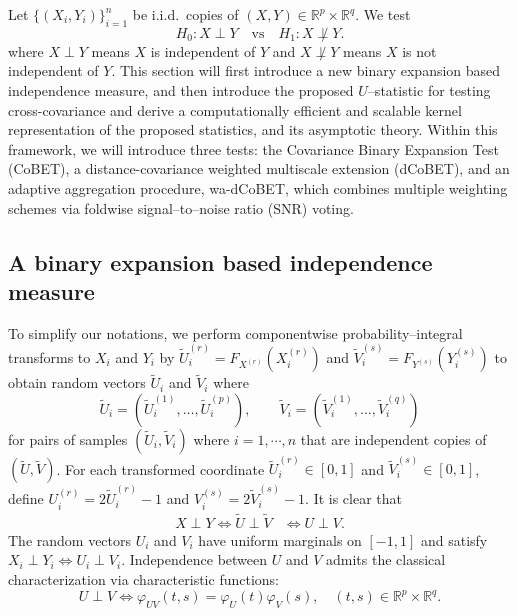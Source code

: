 \documentclass[12pt,reqno,oneside]{amsbook}
\theoremstyle{definition}
\theoremstyle{remark}
\begin{document}
Let $\{(X_i,Y_i)\}_{i=1}^n$ be i.i.d.\ copies of $(X,Y)\in\mathbb R^p\times\mathbb R^q$. 
We test
\[
H_0: X\perp Y
\quad \text{vs} \quad
H_1: X\not\perp Y .
\]
where $X\perp Y$ means $X$ is independent of $Y$ and $X \not\perp Y$ means $X$ is not independent of $Y$.
This section will first introduce a new binary expansion based independence measure, and then introduce the proposed $U$--statistic for testing cross-covariance and derive a computationally efficient and scalable kernel 
representation of the proposed statistics, and its asymptotic theory.
Within this framework, we will introduce three tests: the Covariance Binary Expansion Test (CoBET), a distance-covariance weighted multiscale extension (dCoBET), and an adaptive aggregation procedure, wa-dCoBET, which
combines multiple weighting schemes via foldwise signal--to--noise ratio (SNR) voting.


\subsection{A binary expansion based independence measure}
\label{binary_inde}
To simplify our notations, we perform componentwise probability--integral transforms
to $X_i$ and $Y_i$ by $\tilde{U}_i^{(r)} = F_{X^{(r)}}(X_i^{(r)})$ and $\tilde{V}_i^{(s)} = F_{Y^{(s)}}(Y_i^{(s)})$
to obtain random vectors $\tilde{U}_i$ and $\tilde{V}_i$ where 
\[
\tilde{U}_i = (\tilde{U}_i^{(1)},\dots,\tilde{U}_i^{(p)}),
\qquad
\tilde{V}_i = (\tilde{V}_i^{(1)},\dots,\tilde{V}_i^{(q)})
\]
for pairs of samples $(\tilde{U}_i,\tilde{V}_i)$ where $i=1,\cdots,n$ that are independent copies of 
$(\tilde{U},\tilde{V})$. For each transformed coordinate $\tilde{U}_i^{(r)}\in[0,1]$ and $\tilde{V}_i^{(s)}\in[0,1]$,
define $U_i^{(r)}=2\tilde{U}_i^{(r)}-1$
and $V_i^{(s)}=2\tilde{V}_i^{(s)}-1$. It is clear that
\[
\begin{aligned}
X \perp Y \Longleftrightarrow \tilde{U} \perp \tilde{V}
&\Longleftrightarrow
U \perp V.
\end{aligned}
\]
The random vectors $U_i$ and $V_i$ have uniform marginals on $[-1,1]$ and satisfy
$
X_i \perp Y_i \Longleftrightarrow U_i \perp V_i.
$
Independence between $U$ and $V$ admits the classical characterization via
characteristic functions:
\[
U\perp V
\iff
\varphi_{UV}(t,s)=\varphi_U(t)\varphi_V(s),
\quad (t,s)\in\mathbb R^p\times\mathbb R^q .
\]
\end{document}
